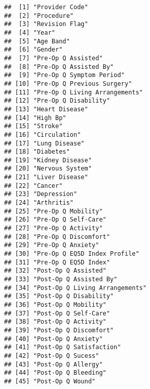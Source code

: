 \documentclass[
]{article}
\begin{document}
\begin{verbatim}
##  [1] "Provider Code"                                 
##  [2] "Procedure"                                     
##  [3] "Revision Flag"                                 
##  [4] "Year"                                          
##  [5] "Age Band"                                      
##  [6] "Gender"                                        
##  [7] "Pre-Op Q Assisted"                             
##  [8] "Pre-Op Q Assisted By"                          
##  [9] "Pre-Op Q Symptom Period"                       
## [10] "Pre-Op Q Previous Surgery"                     
## [11] "Pre-Op Q Living Arrangements"                  
## [12] "Pre-Op Q Disability"                           
## [13] "Heart Disease"                                 
## [14] "High Bp"                                       
## [15] "Stroke"                                        
## [16] "Circulation"                                   
## [17] "Lung Disease"                                  
## [18] "Diabetes"                                      
## [19] "Kidney Disease"                                
## [20] "Nervous System"                                
## [21] "Liver Disease"                                 
## [22] "Cancer"                                        
## [23] "Depression"                                    
## [24] "Arthritis"                                     
## [25] "Pre-Op Q Mobility"                             
## [26] "Pre-Op Q Self-Care"                            
## [27] "Pre-Op Q Activity"                             
## [28] "Pre-Op Q Discomfort"                           
## [29] "Pre-Op Q Anxiety"                              
## [30] "Pre-Op Q EQ5D Index Profile"                   
## [31] "Pre-Op Q EQ5D Index"                           
## [32] "Post-Op Q Assisted"                            
## [33] "Post-Op Q Assisted By"                         
## [34] "Post-Op Q Living Arrangements"                 
## [35] "Post-Op Q Disability"                          
## [36] "Post-Op Q Mobility"                            
## [37] "Post-Op Q Self-Care"                           
## [38] "Post-Op Q Activity"                            
## [39] "Post-Op Q Discomfort"                          
## [40] "Post-Op Q Anxiety"                             
## [41] "Post-Op Q Satisfaction"                        
## [42] "Post-Op Q Sucess"                              
## [43] "Post-Op Q Allergy"                             
## [44] "Post-Op Q Bleeding"                            
## [45] "Post-Op Q Wound"                               

\end{verbatim}
\end{document}

